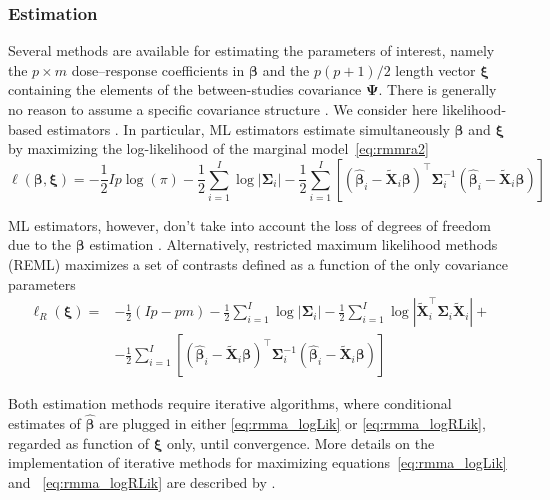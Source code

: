 \documentclass[11pt,a4paper,twoside,openany]{book}\usepackage{knitr}
\begin{document}
{\subsubsection*{Estimation}

Several methods are available for estimating the parameters of interest, namely the $p \times m$ dose--response coefficients in $\boldsymbol{\beta}$ and the $p(p+1)/2$ length vector $\boldsymbol{\xi}$ containing the elements of the between-studies covariance $\boldsymbol{\Psi}$. There is generally no reason to assume a specific covariance structure \citep{white2011multivariate}. We consider here likelihood-based estimators \citep{verbeke1997linear, pinheiro2010mixed}. In particular, ML estimators estimate simultaneously $\boldsymbol{\beta}$ and $\boldsymbol{\xi}$ by maximizing the log-likelihood of the marginal model~\ref{eq:rmmra2}
\begin{equation}
\ell\left(\boldsymbol{\beta}, \boldsymbol{\xi} \right) = -\frac{1}{2}Ip\log(\pi) -\frac{1}{2}\sum_{i=1}^I \log |\boldsymbol{\Sigma}_i| - \frac{1}{2}\sum_{i=1}^I\left[ \left(\boldsymbol{\hat \beta}_i - \widetilde{\mathbf{X}}_i\boldsymbol{\beta} \right)^\top \boldsymbol{\Sigma}_i^{-1} \left(\boldsymbol{\hat \beta}_i - \widetilde{\mathbf{X}}_i\boldsymbol{\beta} \right) \right]
\label{eq:rmma_logLik}
\end{equation}

\noindent ML estimators, however, don’t take into account the loss of degrees of freedom due to the $\boldsymbol{\beta}$ estimation \cite{harville1977maximum}. Alternatively, restricted maximum likelihood methods (REML) maximizes a set of contrasts defined as a function of the only covariance parameters
\begin{align}
\ell_R\left(\boldsymbol{\xi} \right) =& -\frac{1}{2}\left(Ip - pm\right) -\frac{1}{2}\sum_{i=1}^I \log |\boldsymbol{\Sigma}_i| -\frac{1}{2}\sum_{i=1}^I \log \left|\widetilde{\mathbf{X}}_i^\top\boldsymbol{\Sigma}_i\widetilde{\mathbf{X}}_i \right| + \\
&- \frac{1}{2}\sum_{i=1}^I\left[ \left(\boldsymbol{\hat \beta}_i - \widetilde{\mathbf{X}}_i\boldsymbol{\beta} \right)^\top \boldsymbol{\Sigma}_i^{-1} \left(\boldsymbol{\hat \beta}_i - \widetilde{\mathbf{X}}_i\boldsymbol{\beta} \right) \right]
\label{eq:rmma_logRLik}
\end{align}

\noindent Both estimation methods require iterative algorithms, where conditional estimates of $\boldsymbol{\hat \beta}$ are plugged in either \ref{eq:rmma_logLik} or \ref{eq:rmma_logRLik}, regarded as function of $\boldsymbol{\xi}$ only, until convergence. More details on the implementation of iterative methods for maximizing equations~\ref{eq:rmma_logLik} and ~\ref{eq:rmma_logRLik} are described by \cite{gasparrini2012multivariate}.


}
\end{document}
